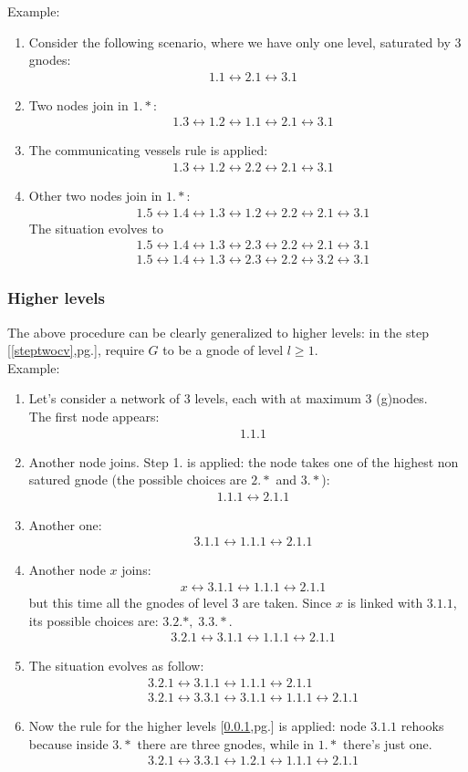 \documentclass[a4paper]{article}
\newcommand{\T}[1]{\textrm{#1}}
\newcommand{\see}[1]{\T{[\ref{#1},pg.\pageref{#1}]}}
\newcommand{\eal}[1]{{\begin{align*} #1 \end{align*}}}
\begin{document}
Example:
\begin{enumerate}
	\item Consider the following scenario, where we have only one level,
		saturated by 3 gnodes:
\eal{ &1.1 \leftrightarrow 2.1 \leftrightarrow 3.1}
\item Two nodes join in $1.*$:
\eal{ &1.3\leftrightarrow 1.2\leftrightarrow 1.1 \leftrightarrow 2.1 \leftrightarrow 3.1}
\item The communicating vessels rule is applied:
\eal{ &1.3\leftrightarrow 1.2\leftrightarrow 2.2 \leftrightarrow 2.1 \leftrightarrow 3.1}
\item Other two nodes join in $1.*$:
\eal{ &1.5\leftrightarrow 1.4\leftrightarrow 1.3\leftrightarrow 1.2\leftrightarrow 2.2 \leftrightarrow 2.1 \leftrightarrow 3.1}
	The situation evolves to
\eal{
&1.5\leftrightarrow 1.4\leftrightarrow 1.3\leftrightarrow
2.3\leftrightarrow 2.2 \leftrightarrow 2.1 \leftrightarrow 3.1\\ 
&1.5\leftrightarrow 1.4\leftrightarrow 1.3\leftrightarrow
2.3\leftrightarrow 2.2 \leftrightarrow 3.2 \leftrightarrow 3.1
}
\end{enumerate}
\subsubsection{Higher levels}
\label{generalizedsteptwocv}
The above procedure can be clearly generalized to higher levels: in the step
\see{steptwocv}, require $G$ to be a gnode of level  $l\ge 1$.\\

Example:
\begin{enumerate}
	\item Let's consider a network of $3$ levels, each with at maximum 3
		(g)nodes.\\
		The first node appears:
		\eal{&1.1.1
		}
	\item Another node joins. Step 1. is applied: the node takes one of the highest non satured	gnode (the possible choices are $2.*$ and $3.*$):
		\eal{&1.1.1 \leftrightarrow 2.1.1}
	\item Another one:
		\eal{&3.1.1 \leftrightarrow 1.1.1 \leftrightarrow 2.1.1 }
	\item Another node $x$ joins:
		\eal{&x\leftrightarrow 3.1.1 \leftrightarrow 1.1.1 \leftrightarrow 2.1.1 }
	but this time all the gnodes of level $3$ are
		taken. Since $x$ is linked with $3.1.1$, its possible choices
		are: $3.2.*,\;3.3.*$.
		\eal{&3.2.1 \leftrightarrow 3.1.1 \leftrightarrow 1.1.1 \leftrightarrow 2.1.1 }
	\item The situation evolves as follow:
	\eal{&
	3.2.1 \leftrightarrow 3.1.1 \leftrightarrow 1.1.1 \leftrightarrow
	2.1.1 \\
	&
	3.2.1 \leftrightarrow 3.3.1 \leftrightarrow 3.1.1 \leftrightarrow 1.1.1 \leftrightarrow 2.1.1 
	}
\item Now the rule for the higher levels \see{generalizedsteptwocv} is applied: node $3.1.1$ rehooks because
	inside $3.*$ there are three gnodes, while in $1.*$ there's just one.
	\eal{&
	3.2.1 \leftrightarrow 3.3.1  \leftrightarrow 1.2.1\leftrightarrow 1.1.1 \leftrightarrow 2.1.1 
	}

\end{enumerate}
\end{document}
